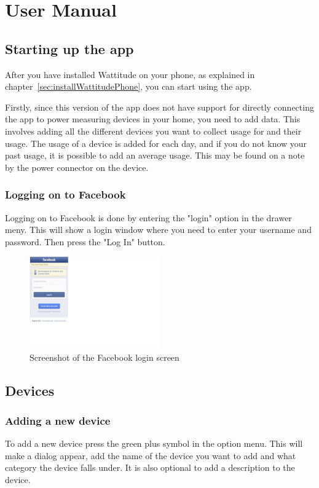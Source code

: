 \chapter{User Manual}

\section{Starting up the app}
After you have installed Wattitude on your phone, as explained in chapter~\ref{sec:installWattitudePhone}, you can start using the app. 

Firstly, since this version of the app does not have support for directly connecting the app to power measuring devices in your home, you need to add data. This involves adding all the different devices you want to collect usage for and their usage. The usage of a device is added for each day, and if you do not know your past usage, it is possible to add an average usage. This may be found on a note by the power connector on the device.

\subsection{Logging on to Facebook}
Logging on to Facebook is done by entering the "login" option in the drawer meny. This will show a login window where you need to enter your username and password. Then press the "Log In" button. 

\begin{figure}[H]
\centering
\includegraphics[width=0.5\textwidth, clip, trim=0cm 5.5cm 20.5cm 0cm]{appendix/usermanual/fig/Facebooklogin.png}
\caption{Screenshot of the Facebook login screen}
\end{figure}


\label{sec:devices}
\section{Devices}
\subsection{Adding a new device}
To add a new device press the green plus symbol in the option menu. This will make a dialog appear, add the name of the device you want to add and what category the device falls under. It is also optional to add a description to the device.

